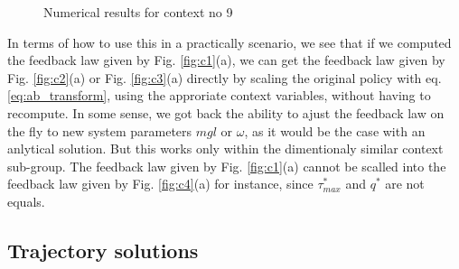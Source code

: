  \begin{figure}[htp]
    \centering
    \vspace{-10pt}
    \caption{Numerical results for context no 9}
    \label{fig:c9}
\end{figure}

In terms of how to use this in a practically scenario, we see that if we computed the feedback law given by Fig. \ref{fig:c1}(a), we can get the feedback law given by Fig. \ref{fig:c2}(a) or Fig. \ref{fig:c3}(a) directly by scaling the original policy with eq. \eqref{eq:ab_transform}, using the approriate context variables, without having to recompute. In some sense, we got back the ability to ajust the feedback law on the fly to new system parameters $mgl$ or $\omega$, as it would be the case with an anlytical solution. But this works only within the dimentionaly similar context sub-group. The feedback law given by Fig. \ref{fig:c1}(a) cannot be scalled into the feedback law given by Fig. \ref{fig:c4}(a) for instance, since $\tau^*_{max}$ and $q^*$ are not equals. 

\subsection{Trajectory solutions}


